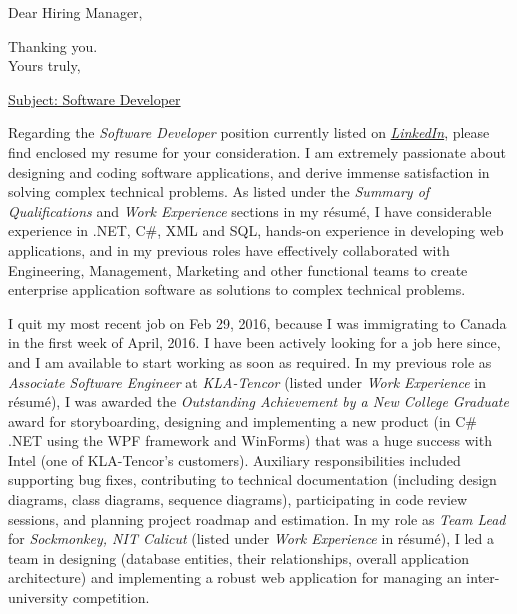 \date{September 23, 2016}
\date{\today}
\opening{Dear Hiring Manager,}
\closing{Thanking you.\\Yours truly,}
\makelettertitle

\underline{Subject: Software Developer}
\newline 

Regarding the \emph{Software Developer} position currently listed on \href{https://www.linkedin.com/jobs/view/205365298?refId=6f630c4d-b372-4e20-bc6a-87deafcbac25}{\emph{LinkedIn}}, please find enclosed my resume for your consideration. I am extremely passionate about designing and coding software applications, and derive immense satisfaction in solving complex technical problems. As listed under the \emph{Summary of Qualifications} and \emph{Work Experience} sections in my résumé, I have considerable experience in .NET, C\#, XML and  SQL, hands-on experience in developing web applications, and in my previous roles have effectively collaborated with Engineering, Management, Marketing and other functional teams to create enterprise application software as solutions to complex technical problems.

I quit my most recent job on Feb 29, 2016, because I was immigrating to Canada in the first week of April, 2016. I have been actively looking for a job here since, and I am available to start working as soon as required. In my previous role as \emph{Associate Software Engineer} at \emph{KLA-Tencor} (listed under \emph{Work Experience} in résumé), I was awarded the \emph{Outstanding Achievement by a New College Graduate} award for storyboarding, designing and implementing a new product (in C\# .NET using the WPF framework and WinForms) that was a huge success with Intel (one of KLA-Tencor's customers). Auxiliary responsibilities included supporting bug fixes, contributing to technical documentation (including design diagrams, class diagrams, sequence diagrams), participating in code review sessions, and planning project roadmap and estimation. In my role as \emph{Team Lead} for \emph{Sockmonkey, NIT Calicut} (listed under \emph{Work Experience} in résumé), I led a team in designing (database entities, their relationships, overall application architecture) and implementing a robust web application for managing an inter-university competition.


